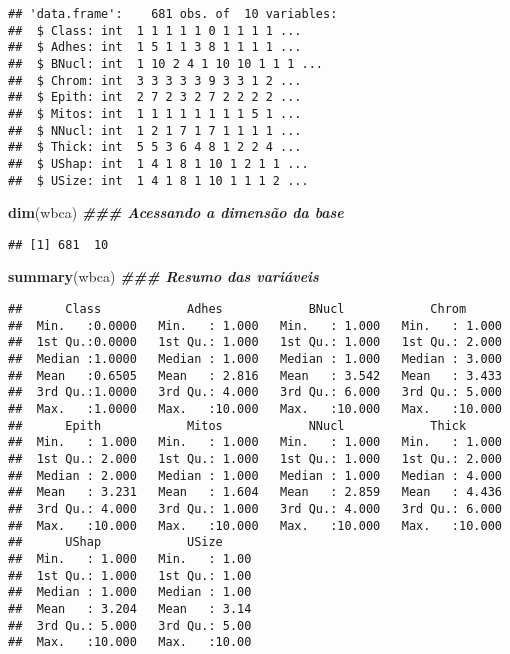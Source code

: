 \documentclass[
]{article}
\newenvironment{Shaded}{\begin{snugshade}}{\end{snugshade}}
\newcommand{\DocumentationTok}[1]{\textcolor[rgb]{0.56,0.35,0.01}{\textbf{\textit{#1}}}}
\newcommand{\FunctionTok}[1]{\textcolor[rgb]{0.13,0.29,0.53}{\textbf{#1}}}
\newcommand{\NormalTok}[1]{#1}
\begin{document}
\begin{verbatim}
## 'data.frame':    681 obs. of  10 variables:
##  $ Class: int  1 1 1 1 1 0 1 1 1 1 ...
##  $ Adhes: int  1 5 1 1 3 8 1 1 1 1 ...
##  $ BNucl: int  1 10 2 4 1 10 10 1 1 1 ...
##  $ Chrom: int  3 3 3 3 3 9 3 3 1 2 ...
##  $ Epith: int  2 7 2 3 2 7 2 2 2 2 ...
##  $ Mitos: int  1 1 1 1 1 1 1 1 5 1 ...
##  $ NNucl: int  1 2 1 7 1 7 1 1 1 1 ...
##  $ Thick: int  5 5 3 6 4 8 1 2 2 4 ...
##  $ UShap: int  1 4 1 8 1 10 1 2 1 1 ...
##  $ USize: int  1 4 1 8 1 10 1 1 1 2 ...
\end{verbatim}

\begin{Shaded}
\begin{Highlighting}[]
\FunctionTok{dim}\NormalTok{(wbca) }\DocumentationTok{\#\#\# Acessando a dimensão da base}
\end{Highlighting}
\end{Shaded}

\begin{verbatim}
## [1] 681  10
\end{verbatim}

\begin{Shaded}
\begin{Highlighting}[]
\FunctionTok{summary}\NormalTok{(wbca) }\DocumentationTok{\#\#\# Resumo das variáveis}
\end{Highlighting}
\end{Shaded}

\begin{verbatim}
##      Class            Adhes            BNucl            Chrom       
##  Min.   :0.0000   Min.   : 1.000   Min.   : 1.000   Min.   : 1.000  
##  1st Qu.:0.0000   1st Qu.: 1.000   1st Qu.: 1.000   1st Qu.: 2.000  
##  Median :1.0000   Median : 1.000   Median : 1.000   Median : 3.000  
##  Mean   :0.6505   Mean   : 2.816   Mean   : 3.542   Mean   : 3.433  
##  3rd Qu.:1.0000   3rd Qu.: 4.000   3rd Qu.: 6.000   3rd Qu.: 5.000  
##  Max.   :1.0000   Max.   :10.000   Max.   :10.000   Max.   :10.000  
##      Epith            Mitos            NNucl            Thick       
##  Min.   : 1.000   Min.   : 1.000   Min.   : 1.000   Min.   : 1.000  
##  1st Qu.: 2.000   1st Qu.: 1.000   1st Qu.: 1.000   1st Qu.: 2.000  
##  Median : 2.000   Median : 1.000   Median : 1.000   Median : 4.000  
##  Mean   : 3.231   Mean   : 1.604   Mean   : 2.859   Mean   : 4.436  
##  3rd Qu.: 4.000   3rd Qu.: 1.000   3rd Qu.: 4.000   3rd Qu.: 6.000  
##  Max.   :10.000   Max.   :10.000   Max.   :10.000   Max.   :10.000  
##      UShap            USize      
##  Min.   : 1.000   Min.   : 1.00  
##  1st Qu.: 1.000   1st Qu.: 1.00  
##  Median : 1.000   Median : 1.00  
##  Mean   : 3.204   Mean   : 3.14  
##  3rd Qu.: 5.000   3rd Qu.: 5.00  
##  Max.   :10.000   Max.   :10.00
\end{verbatim}
\end{document}
